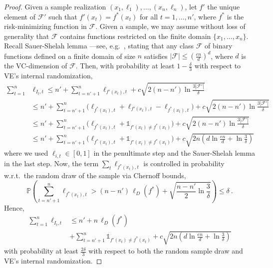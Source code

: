 \documentclass[11pt]{hackednow}
\renewcommand{\P}{\mathbb{P}}
\newcommand{\cF}{\mathcal{F}}
\def\ds1{\mathds{1}}
\begin{document}
\begin{proof}
Given a sample realization $(x_1,\ell_1),\dots,(x_n,\ell_n)$, let $f'$ the unique element of $\cF'$ such that $f'(x_t) = f^*(x_t)$ for all $t=1,\dots,n'$, where $f^*$ is the risk-minimizing function in $\cF$. Given a sample, we may assume without loss of generality that $\cF$ contains functions restricted on the finite domain $\{x_1,\dots,x_n\}$. Recall Sauer-Shelah lemma ---see, e.g.~\cite{BBL05}, stating that any class $\cF$ of binary functions defined on a finite domain of size $n$ satisfies $|\cF| \le \left(\frac{en}{d}\right)^d$, where $d$ is the VC-dimension of $\cF$. 
Then, with probability at least $1- \tfrac{\delta}{3}$ with respect to VE's internal randomization,
\begin{align*}
    \sum_{t=1}^n &\ell_{I_t,t}
\le
    n' + \sum_{t=n'+1}^n \ell_{f'(x_t),t} + c\sqrt{2(n-n')\ln\frac{3|\cF'|}{\delta}}
\\ &\le
    n' + \sum_{t=n'+1}^n \bigl( \ell_{f^*(x_t),t} + \ell_{f'(x_t),t} - \ell_{f^*(x_t),t}\bigr) + c\sqrt{2(n-n')\ln\frac{3|\cF'|}{\delta}}
\\ &\le
    n' + \sum_{t=n'+1}^n \bigl( \ell_{f^*(x_t),t} + \ds1_{f'(x_t) \neq f^*(x_t)} \bigr) + c\sqrt{2(n-n')\ln\frac{3|\cF'|}{\delta}}
\\ &\le
    n' + \sum_{t=n'+1}^n \bigl( \ell_{f^*(x_t),t} + \ds1_{f'(x_t) \neq f^*(x_t)} \bigr) + c\sqrt{2n\left(d\ln\frac{en}{d}+ \ln\frac{3}{\delta}\right)}
\end{align*}
where we used $\ell_{i,t}\in [0,1]$ in the penultimate step and the Sauer-Shelah lemma in the last step.
Now, the term $\sum_t \ell_{f^*(x_t),t}$ is controlled in probability w.r.t.\ the random draw of the sample via Chernoff bounds,
\[
    \P\left(\sum_{t=n'+1}^n \ell_{f^*(x_t),t} > (n-n')\,\ell_D(f^*) + \sqrt{\frac{n-n'}{2}\ln\frac{3}{\delta}} \right) \le \delta~.
\]
Hence,
\begin{align*}
    \sum_{t=1}^n \ell_{I_t,t}
&\le
    n' + n\,\ell_D(f^*)
\\ &+ \sum_{t=n'+1}^n \ds1_{f'(x_t) \neq f^*(x_t)} + c\sqrt{2n\left(d\ln\frac{en}{d}+ \ln\frac{3}{\delta}\right)}
\end{align*}
with probability at least $\tfrac{2\delta}{3}$ with respect to both the random sample draw and VE's internal randomization.


\end{proof}
\end{document}
